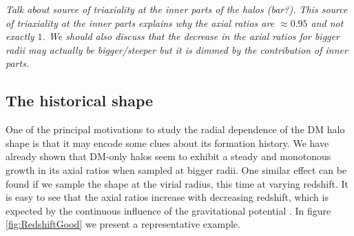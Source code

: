\documentclass[a4paper,fleqn,usenatbib]{mnras}
\begin{document}
\textit{ Talk about source of triaxiality at the inner parts of the
  halos (bar?). This source of triaxiality at the inner parts explains
  why the axial ratios are $\approx 0.95$ and not exactly $1$. We
  should also discuss that the decrease in the axial ratios for bigger
  radii may actually be bigger/steeper but it is dimmed by the
  contribution of inner parts.} 
%


\subsection{The historical shape}
One of the principal motivations to study the radial dependence of the
DM halo shape is that it may encode some clues about its formation
history. We have already shown that DM-only halos seem to exhibit a
steady and monotonous growth in its axial ratios when sampled at
bigger radii. One similar effect can be found if we sample the shape
at the virial radius, this time at varying redshift. It is easy to see
that the axial ratios increase with decreasing redshift, which is
expected by the continuous influence of the gravitational potential
\cite{VeraCiro}. In figure \ref{fig:RedshiftGood} we present a
representative example.  
 
\end{document}
